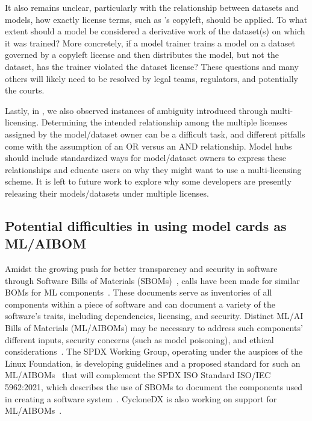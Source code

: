 It also remains unclear, particularly with the relationship between datasets and models, how exactly license terms, such as 's copyleft, should be applied.  To what extent should a model be considered a derivative work of the dataset(s) on which it was trained?  More concretely, if a model trainer trains a model on a dataset governed by a copyleft license and then distributes the model, but not the dataset, has the trainer violated the dataset license?  These questions and many others will likely need to be resolved by legal teams, regulators, and potentially the courts.


Lastly, in , we also observed instances of ambiguity introduced through multi-licensing.  Determining the intended relationship among the multiple licenses assigned by the model/dataset owner can be a difficult task, and different pitfalls come with the assumption of an OR versus an AND relationship.  Model hubs should include standardized ways for model/dataset owners to express these relationships and educate users on why they might want to use a multi-licensing scheme.  It is left to future work to explore why some developers are presently releasing their models/datasets under multiple licenses. %





\subsection{Potential difficulties in using model cards as ML/AIBOM}
Amidst the growing push for better transparency and security in software through Software Bills of Materials (SBOMs)~\cite{xia2023empirical, stalnaker2024boms}, calls have been made for similar BOMs for ML components~\cite{stalnaker2024boms, xia2023empirical, barclay2019towards, barclay2022providing}. These documents serve as inventories of all components within a piece of software and can document a variety of the software's traits, including dependencies, licensing, and security. Distinct ML/AI Bills of Materials (ML/AIBOMs) may be necessary to address such components' different inputs, security concerns (such as model poisoning), and ethical considerations~\cite{xia2023empirical, xia2023trust, bi2024way, lu2024taxonomy}. The SPDX \cite{spdx} Working Group, operating under the auspices of the Linux Foundation, is developing guidelines and a proposed standard for such an ML/AIBOMs~\cite{aibom2024} that will complement the SPDX ISO Standard ISO/IEC 5962:2021, which describes the use of SBOMs to document the components used in creating a software system~\cite{ISO5962-2021}. CycloneDX \cite{cyclonedx} is also working on support for ML/AIBOMs~\cite{cyclonedx-mlbom}. %

